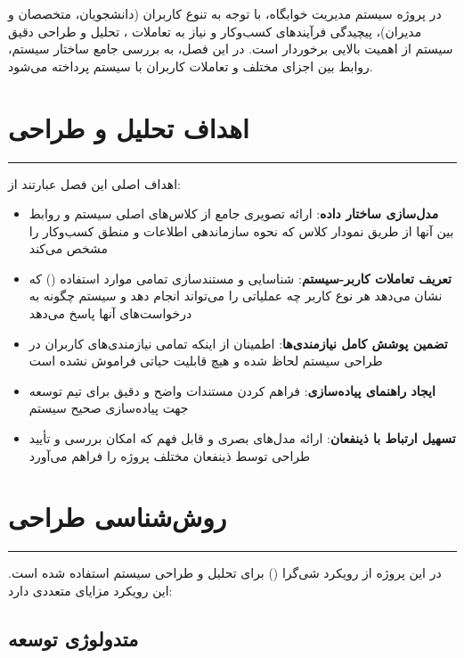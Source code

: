 \documentclass[12pt,a4paper]{report}
\begin{document}
	در پروژه سیستم مدیریت خوابگاه، با توجه به تنوع کاربران (دانشجویان، متخصصان و مدیران)، پیچیدگی فرآیندهای کسب‌وکار و نیاز به تعاملات ، تحلیل و طراحی دقیق سیستم از اهمیت بالایی برخوردار است. در این فصل، به بررسی جامع ساختار سیستم، روابط بین اجزای مختلف و تعاملات کاربران با سیستم پرداخته می‌شود.
	
	\section{اهداف تحلیل و طراحی}
	
	\noindent\rule{\textwidth}{0.4pt}
	
	اهداف اصلی این فصل عبارتند از:
	
	\begin{itemize}
		\item \textbf{مدل‌سازی ساختار داده}: ارائه تصویری جامع از کلاس‌های اصلی سیستم و روابط بین آنها از طریق نمودار کلاس که نحوه سازماندهی اطلاعات و منطق کسب‌وکار را مشخص می‌کند
		
		\item \textbf{تعریف تعاملات کاربر-سیستم}: شناسایی و مستندسازی تمامی موارد استفاده () که نشان می‌دهد هر نوع کاربر چه عملیاتی را می‌تواند انجام دهد و سیستم چگونه به درخواست‌های آنها پاسخ می‌دهد
		
		\item \textbf{تضمین پوشش کامل نیازمندی‌ها}: اطمینان از اینکه تمامی نیازمندی‌های کاربران در طراحی سیستم لحاظ شده و هیچ قابلیت حیاتی فراموش نشده است
		
		\item \textbf{ایجاد راهنمای پیاده‌سازی}: فراهم کردن مستندات واضح و دقیق برای تیم توسعه جهت پیاده‌سازی صحیح سیستم
		
		\item \textbf{تسهیل ارتباط با ذینفعان}: ارائه مدل‌های بصری و قابل فهم که امکان بررسی و تأیید طراحی توسط ذینفعان مختلف پروژه را فراهم می‌آورد
	\end{itemize}
	
	\section{روش‌شناسی طراحی}
	
	\noindent\rule{\textwidth}{0.4pt}
	
	در این پروژه از رویکرد شی‌گرا () برای تحلیل و طراحی سیستم استفاده شده است. این رویکرد مزایای متعددی دارد:
	
	\subsection{متدولوژی توسعه}
	
\end{document}

